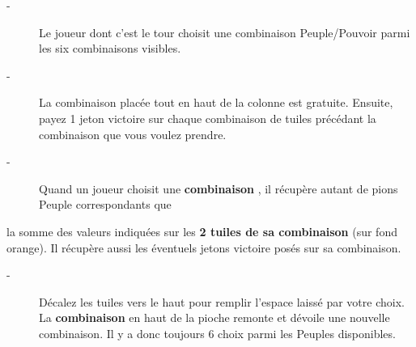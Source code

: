 \documentclass{scrartcl}%
\begin{document}
%
\begin{description}%
\item[{-} ]%
%
 Le joueur dont c'est le tour choisit une combinaison Peuple/Pouvoir parmi les six combinaisons visibles.
%
\item[{-} ]%
%
 La combinaison placée tout en haut de la colonne est gratuite. Ensuite, payez 1 jeton victoire sur chaque combinaison de tuiles précédant la combinaison que vous voulez prendre.
%
\item[{-} ]%
%
 Quand un joueur choisit une %
\textcolor{mygreen}{%
\textbf{combinaison}%
}%
, il récupère autant de pions Peuple correspondants que
%
\end{description}%
la somme des valeurs indiquées sur les %
\textcolor{mygreen}{%
\textbf{2 tuiles de sa combinaison}%
}%
\textit{ }%
 (sur fond orange). Il récupère aussi les éventuels jetons victoire posés sur sa combinaison.
%
\begin{description}%
\item[{-} ]%
%
 Décalez les tuiles vers le haut pour remplir l’espace laissé par votre choix. La %
\textcolor{mygreen}{%
\textbf{combinaison}%
}%
\textit{ }%
 en haut de la pioche remonte et dévoile une nouvelle combinaison. Il y a donc toujours 6 choix parmi les Peuples disponibles.
%
\end{description}

%
\end{document}
